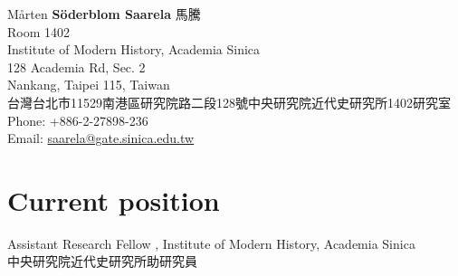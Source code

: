 \documentclass[10pt,a4paper]{article}
\newcommand{\years}[1]{\marginnote{\scriptsize #1}}
\begin{document}
{\LARGE Mårten \textbf{Söderblom Saarela} 馬騰}\\[0.5cm]
Room 1402\\
Institute of Modern History, Academia Sinica\\ 
128 Academia Rd, Sec. 2\\
Nankang, Taipei 115, Taiwan\\[.2cm]
台灣台北市11529南港區研究院路二段128號中央研究院近代史研究所1402研究室\\[.2cm]
Phone: 	+886-2-27898-236\\[.2cm]
\noindent Email: \href{mailto:saarela@gate.sinica.edu.tw}{saarela@gate.sinica.edu.tw} %









\section*{Current position%
}
\noindent \years{2019--}Assistant Research Fellow%
, Institute of Modern History, Academia Sinica\\ 中央研究院近代史研究所助研究員
\end{document}

